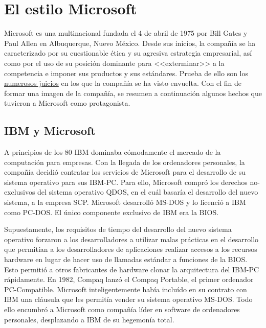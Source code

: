 \section{El estilo Microsoft}
Microsoft es una multinacional fundada el 4 de abril de 1975 por Bill Gates y Paul Allen en Albuquerque, Nuevo México. Desde sus inicios, la compañía se ha caracterizado por su cuestionable ética y su agresiva estrategia empresarial, así como por el uso de su posición dominante para <<exterminar>> a la competencia e imponer sus productos y sus estándares. Prueba de ello son los \href{https://en.wikipedia.org/wiki/Microsoft_litigation}{numerosos juicios} en los que la compañía se ha visto envuelta\cite{wiki_2020:microsoft_litigation}. Con el fin de formar una imagen de la compañía, se resumen a continuación algunos hechos que tuvieron a Microsoft como protagonista.

\subsection{IBM y Microsoft}
A principios de los 80 IBM dominaba cómodamente el mercado de la computación para empresas. Con la llegada de los ordenadores personales, la compañía decidió contratar los servicios de Microsoft para el desarrollo de su sistema operativo para sus IBM-PC. Para ello, Microsoft compró los derechos no-exclusivos del sistema operativo QDOS, en el cuál basaría el desarrollo del nuevo sistema, a la empresa SCP. Microsoft desarrolló MS-DOS y lo licenció a IBM como PC-DOS. El único componente exclusivo de IBM era la BIOS.\cite{tdith_deal_with_devil_2019}\cite{tdith_rights_to_86DOS:2019}

Supuestamente, los requisitos de tiempo del desarrollo del nuevo sistema operativo forzaron a los desarrolladores a utilizar malas prácticas en el desarrollo que permitían a los desarrolladores de aplicaciones realizar accesos a los recursos hardware en lugar de hacer uso de llamadas estándar a funciones de la BIOS. Esto permitió a otros fabricantes de hardware clonar la arquitectura del IBM-PC rápidamente. En 1982, Compaq lanzó el Compaq Portable, el primer ordenador PC-Compatible. Microsoft inteligentemente había incluído en su contrato con IBM una cláusula que les permitía vender su sistema operativo MS-DOS. Todo ello encumbró a Microsoft como compañía líder en software de ordenadores personales, desplazando a IBM de su hegemonía total.\cite{wiki:ibm-pc-compatible-origins}

